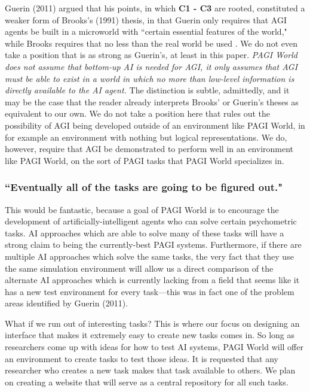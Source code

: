 Guerin (2011) argued that his points, in which \textbf{C1 - C3} are rooted, constituted a weaker form of Brooks's (1991) thesis, in that Guerin only requires that AGI agents be built in a microworld with ``certain essential features of the world," while Brooks requires that no less than the real world be used \cite{Brooks1991}. We do not even take a position that is as strong as Guerin's, at least in this paper. \textit{PAGI World does not assume that bottom-up AI is needed for AGI, it only assumes that AGI must be able to exist in a world in which no more than low-level information is directly available to the AI agent.} The distinction is subtle, admittedly, and it may be the case that the reader already interprets Brooks' or Guerin's theses as equivalent to our own. We do not take a position here that rules out the possibility of AGI being developed outside of an environment like PAGI World, in for example an environment with nothing but logical representations. We do, however, require that AGI be demonstrated to perform well in an environment like PAGI World, on the sort of PAGI tasks that PAGI World specializes in.

\subsubsection{``Eventually all of the tasks are going to be figured out."}

This would be fantastic, because a goal of PAGI World is to encourage the development of artificially-intelligent agents who can solve certain psychometric tasks. AI approaches which are able to solve many of these tasks will have a strong claim to being the currently-best PAGI systems. Furthermore, if there are multiple AI approaches which solve the same tasks, the very fact that they use the same simulation environment will allow us a direct comparison of the alternate AI approaches which is currently lacking from a field that seems like it has a new test environment for every task---this was in fact one of the problem areas identified by Guerin (2011).

What if we run out of interesting tasks? This is where our focus on designing an interface that makes it extremely easy to create new tasks comes in. So long as researchers come up with ideas for how to test AI systems, PAGI World will offer an environment to create tasks to test those ideas. It is requested that any researcher who creates a new task makes that task available to others. We plan on creating a website that will serve as a central repository for all such tasks.

